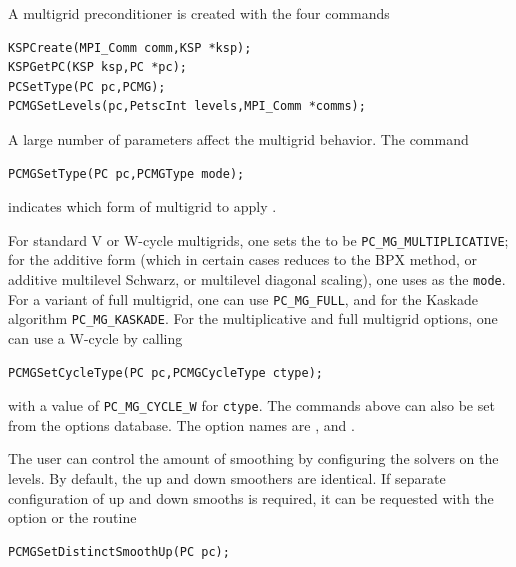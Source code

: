 A multigrid preconditioner is created with the four commands
\begin{lstlisting}
KSPCreate(MPI_Comm comm,KSP *ksp);
KSPGetPC(KSP ksp,PC *pc);
PCSetType(PC pc,PCMG);
PCMGSetLevels(pc,PetscInt levels,MPI_Comm *comms);
\end{lstlisting}
A large number of parameters affect the multigrid behavior. The command
\begin{lstlisting}
PCMGSetType(PC pc,PCMGType mode);
\end{lstlisting}
indicates which form of multigrid to apply \cite{1sbg}.
  

For standard V or W-cycle multigrids, one sets the  to be  \lstinline{PC_MG_MULTIPLICATIVE}; for the
additive form (which in certain cases reduces to the BPX method, or additive
multilevel Schwarz, or multilevel diagonal scaling), one uses
  as the \lstinline{mode}.  For a variant
of full multigrid, one can
 use  \lstinline{PC_MG_FULL}, and for the Kaskade
algorithm  \lstinline{PC_MG_KASKADE}.
For the multiplicative and full multigrid options, one can use a
W-cycle by   calling
\begin{lstlisting}
PCMGSetCycleType(PC pc,PCMGCycleType ctype);
\end{lstlisting}
with a value of \lstinline{PC_MG_CYCLE_W} for \lstinline{ctype}.
The commands above can also be set from the options database. The option
names are ,
and  .  

The user can control the amount of smoothing
  by configuring the solvers on
the levels.  By default, the up and down smoothers are identical.  If
separate configuration of up and down smooths is required, it can be
requested with the option 
 or the routine
\begin{lstlisting}
PCMGSetDistinctSmoothUp(PC pc);
\end{lstlisting}

